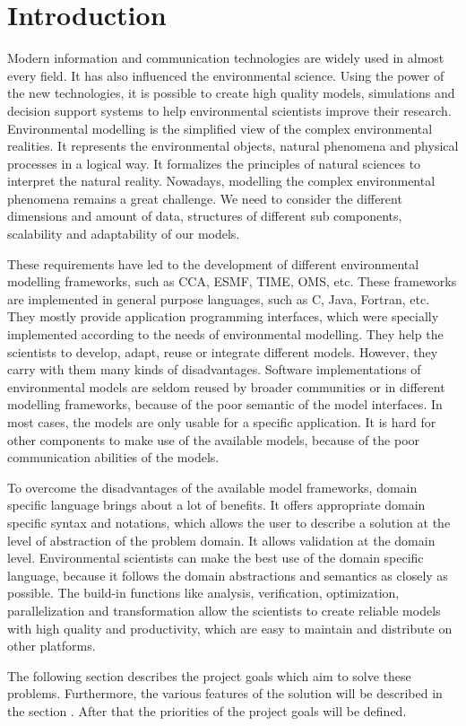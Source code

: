 \chapter{Introduction} \label{chap:introduction}
\par
Modern information and communication technologies are widely used in almost every field.  It has also influenced the environmental science. Using the power of the new technologies, it is possible to create high quality models, simulations and decision support systems to help environmental scientists improve their research. Environmental modelling is the simplified view of the complex environmental realities. It represents the environmental objects, natural phenomena and physical processes in a logical way. It formalizes the principles of natural sciences to interpret the natural reality. Nowadays, modelling the complex environmental phenomena remains a great challenge. We need to consider the different dimensions and amount of data, structures of different sub components, scalability and adaptability of our models.
\par
These requirements have led to the development of different environmental modelling frameworks, such as CCA, ESMF, TIME, OMS, etc. These frameworks are implemented in general purpose languages, such as C, Java, Fortran, etc. They mostly provide application programming interfaces, which were specially implemented according to the needs of environmental modelling. They help the scientists to develop, adapt, reuse or integrate different models. However, they carry with them many kinds of disadvantages. Software implementations of environmental models are seldom reused by broader communities or in different modelling frameworks, because of the poor semantic of the model interfaces. In most cases, the models are only usable for a specific application. It is hard for other components to make use of the available models, because of the poor communication abilities of the models.
\par
To overcome the disadvantages of the available model frameworks, domain specific language brings about a lot of benefits. It offers appropriate domain specific syntax and notations, which allows the user to describe a solution at the level of abstraction of the problem domain. It allows validation at the domain level. Environmental scientists can make the best use of the domain specific language, because it follows the domain abstractions and semantics as closely as possible. The build-in functions like analysis, verification, optimization, parallelization and  transformation allow the scientists to create reliable models with high quality and productivity, which are easy to maintain and distribute on other platforms.
\par
The following section describes the project goals which aim to solve these problems. Furthermore, the various features of the solution will be described in the section . After that the priorities of the project goals will be defined.

